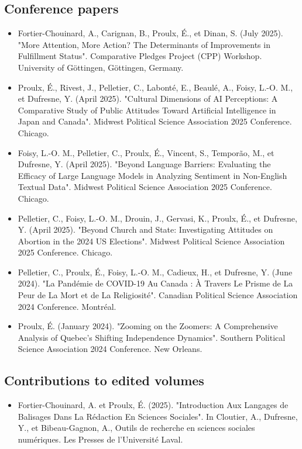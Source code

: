 \documentclass[11pt,letterpaper,sans]{moderncv}        %
\begin{document}
\subsection{\textbf{Conference papers}}
\begin{itemize}
    \item Fortier-Chouinard, A., Carignan, B., Proulx, É., et Dinan, S. (July 2025). "More Attention, More Action? The Determinants of Improvements in Fulfillment Status". Comparative Pledges Project (CPP) Workshop. University of Göttingen, Göttingen, Germany.
    \item Proulx, É., Rivest, J., Pelletier, C., Labonté, E., Beaulé, A., Foisy, L.-O. M., et Dufresne, Y. (April 2025). "Cultural Dimensions of AI Perceptions: A Comparative Study of Public Attitudes Toward Artificial Intelligence in Japan and Canada". Midwest Political Science Association 2025 Conference. Chicago.
    \item Foisy, L.-O. M., Pelletier, C., Proulx, É., Vincent, S., Temporão, M., et Dufresne, Y. (April 2025). "Beyond Language Barriers: Evaluating the Efficacy of Large Language Models in Analyzing Sentiment in Non-English Textual Data". Midwest Political Science Association 2025 Conference. Chicago.
    \item Pelletier, C., Foisy, L.-O. M., Drouin, J., Gervasi, K., Proulx, É., et Dufresne, Y. (April 2025). "Beyond Church and State: Investigating Attitudes on Abortion in the 2024 US Elections". Midwest Political Science Association 2025 Conference. Chicago.
    \item Pelletier, C., Proulx, É., Foisy, L.-O. M., Cadieux, H., et Dufresne, Y. (June 2024). "La Pandémie de COVID-19 Au Canada : À Travers Le Prisme de La Peur de La Mort et de La Religiosité". Canadian Political Science Association 2024 Conference. Montréal.
    \item Proulx, É. (January 2024). "Zooming on the Zoomers: A Comprehensive Analysis of Quebec's Shifting Independence Dynamics". Southern Political Science Association 2024 Conference. New Orleans.
\end{itemize}

\subsection{\textbf{Contributions to edited volumes}}
\begin{itemize}
  \item Fortier-Chouinard, A. et Proulx, É. (2025). "Introduction Aux Langages de Balisages Dans La Rédaction En Sciences Sociales". In Cloutier, A., Dufresne, Y., et Bibeau-Gagnon, A., Outils de recherche en sciences sociales numériques. Les Presses de l'Université Laval.
\end{itemize}
\end{document}
